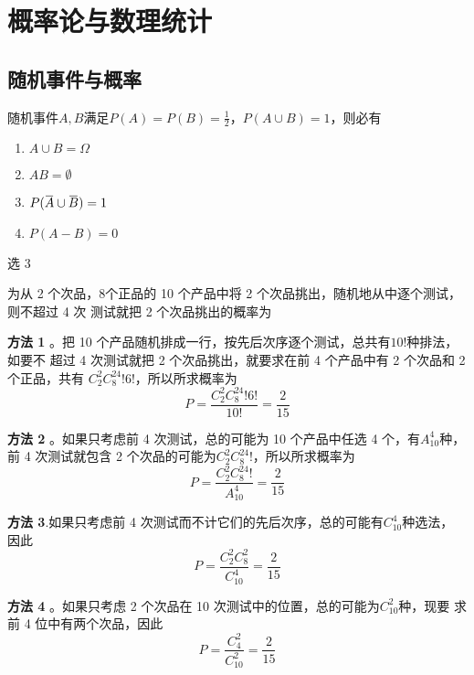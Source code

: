 \documentclass{article}
\begin{document}
\section{概率论与数理统计}
\label{sec:orgfcf95d4}
\subsection{随机事件与概率}
\label{sec:org920c730}
\begin{examplle}[]
随机事件\(A,B\)满足\(P(A)=P(B)=\frac{1}{2}\)，\(P(A\cup B)=1\)，则必有
\begin{enumerate}
\item \(A\cup B=\Omega\)
\item \(AB=\emptyset\)
\item \(P(\bbar{A}\cup\bbar{B})=1\)
\item \(P(A-B)=0\)
\end{enumerate}


选 3
\end{examplle}

\begin{examplle}[]
为从 2 个次品，8个正品的 10 个产品中将 2 个次品挑出，随机地从中逐个测试，则不超过 4 次
测试就把 2 个次品挑出的概率为

\textbf{方法 1} 。把 10 个产品随机排成一行，按先后次序逐个测试，总共有\(10!\)种排法，如要不
 超过 4 次测试就把 2 个次品挑出，就要求在前 4 个产品中有 2 个次品和 2 个正品，共有
 \(C_2^2C_8^24!6!\)，所以所求概率为
\begin{equation*}
P=\frac{C_2^2C_8^24!6!}{10!}=\frac{2}{15}
\end{equation*}

\textbf{方法 2} 。如果只考虑前 4 次测试，总的可能为 10 个产品中任选 4 个，有\(A_{10}^4\)种，前
 4 次测试就包含 2 个次品的可能为\(C_2^2C_8^24!\)，所以所求概率为
\begin{equation*}
P=\frac{C_2^2C_8^24!}{A_{10}^4}=\frac{2}{15}
\end{equation*}

\textbf{方法 3}.如果只考虑前 4 次测试而不计它们的先后次序，总的可能有\(C_{10}^4\)种选法，
 因此
\begin{equation*}
P=\frac{C_2^2C_8^2}{C_{10}^4}=\frac{2}{15}
\end{equation*}

\textbf{方法 4} 。如果只考虑 2 个次品在 10 次测试中的位置，总的可能为\(C_{10}^2\)种，现要
 求前 4 位中有两个次品，因此
\begin{equation*}
P=\frac{C_4^2}{C_{10}^2}=\frac{2}{15}
\end{equation*}
\end{examplle}
\end{document}
